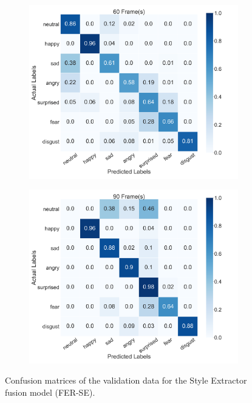 \begin{figure}
\begin{subfigure}[b]{0.45\textwidth}
      \includegraphics[width=\textwidth]{res/conf_busso_60.png}
    \end{subfigure}
    \begin{subfigure}[b]{0.45\textwidth}
      \includegraphics[width=\textwidth]{res/conf_busso_90.png}
    \end{subfigure}
    \caption{Confusion matrices of the validation data for the Style Extractor fusion model (FER-SE).}
    \label{fig:busso_conf}
\end{figure}


